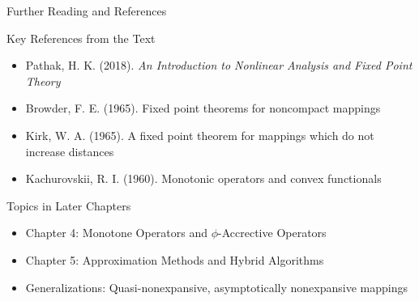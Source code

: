 \documentclass[aspectratio=169,10pt]{beamer}
\begin{document}
\begin{frame}[allowframebreaks]{Further Reading and References}
    \begin{block}{Key References from the Text}
        \begin{itemize}
            \item Pathak, H. K. (2018). \textit{An Introduction to Nonlinear Analysis and Fixed Point Theory}

            \item Browder, F. E. (1965). Fixed point theorems for noncompact mappings

            \item Kirk, W. A. (1965). A fixed point theorem for mappings which do not increase distances

            \item Kachurovskii, R. I. (1960). Monotonic operators and convex functionals
        \end{itemize}
    \end{block}

    \vspace{0.5cm}

    \begin{block}{Topics in Later Chapters}
        \begin{itemize}
            \item Chapter 4: Monotone Operators and $\phi$-Accrective Operators

            \item Chapter 5: Approximation Methods and Hybrid Algorithms

            \item Generalizations: Quasi-nonexpansive, asymptotically nonexpansive mappings
        \end{itemize}
    \end{block}
\end{frame}
\end{document}
